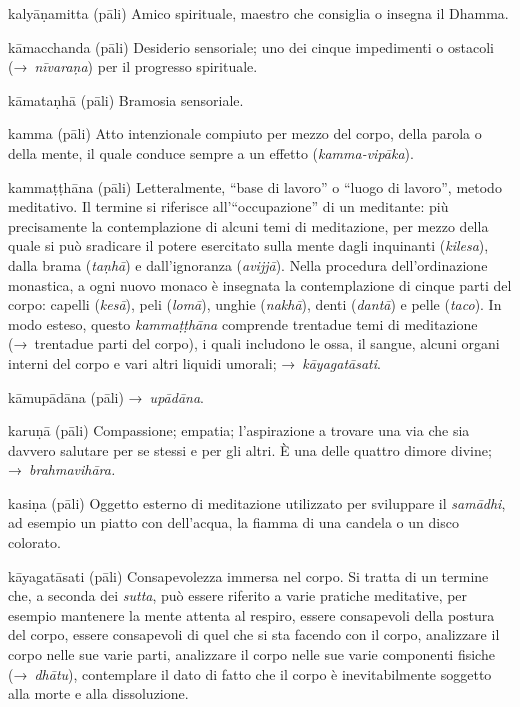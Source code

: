 \begin{glossarydescription}
\item[kalyāṇamitta] (pāli) Amico spirituale, maestro che consiglia o insegna il
  Dhamma.

\item[kāmacchanda] (pāli) Desiderio sensoriale; uno dei cinque impedimenti o
  ostacoli (→~\emph{nīvaraṇa}) per il progresso spirituale.

\item[kāmataṇhā] (pāli) Bramosia sensoriale.

\item[kamma] (pāli) Atto intenzionale compiuto per mezzo del corpo, della parola
  o della mente, il quale conduce sempre a un effetto (\emph{kamma-vipāka}).

\item[kammaṭṭhāna] (pāli) Letteralmente, ``base di lavoro'' o ``luogo di
  lavoro'', metodo meditativo. Il termine si riferisce all'``occupazione'' di un
  meditante: più precisamente la contemplazione di alcuni temi di meditazione,
  per mezzo della quale si può sradicare il potere esercitato sulla mente dagli
  inquinanti (\emph{kilesa}), dalla brama (\emph{taṇhā}) e dall'ignoranza
  (\emph{avijjā}). Nella procedura dell'ordinazione monastica, a ogni nuovo
  monaco è insegnata la contemplazione di cinque parti del corpo: capelli
  (\emph{kesā}), peli (\emph{lomā}), unghie (\emph{nakhā}), denti (\emph{dantā})
  e pelle (\emph{taco}). In modo esteso, questo \emph{kammaṭṭhāna} comprende
  trentadue temi di meditazione (→~trentadue parti del corpo), i quali includono
  le ossa, il sangue, alcuni organi interni del corpo e vari altri liquidi
  umorali; →~\emph{kāyagatāsati}.

\item[kāmupādāna] (pāli) →~\emph{upādāna}.

\item[karuṇā] (pāli) Compassione; empatia; l'aspirazione a trovare una via che
  sia davvero salutare per se stessi e per gli altri. È una delle quattro dimore
  divine; →~\emph{brahmavihāra.}

\item[kasiṇa] (pāli) Oggetto esterno di meditazione utilizzato per sviluppare il
  \emph{samādhi}, ad esempio un piatto con dell'acqua, la fiamma di una candela
  o un disco colorato.

\item[kāyagatāsati] (pāli) Consapevolezza immersa nel corpo. Si tratta di un
  termine che, a seconda dei \emph{sutta}, può essere riferito a varie pratiche
  meditative, per esempio mantenere la mente attenta al respiro, essere
  consapevoli della postura del corpo, essere consapevoli di quel che si sta
  facendo con il corpo, analizzare il corpo nelle sue varie parti, analizzare il
  corpo nelle sue varie componenti fisiche (→~\emph{dhātu}), contemplare il dato
  di fatto che il corpo è inevitabilmente soggetto alla morte e alla
  dissoluzione.


\end{glossarydescription}
